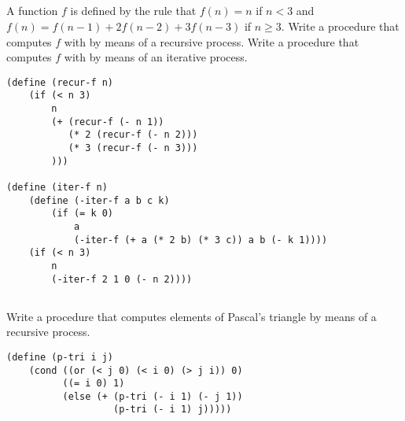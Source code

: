 \documentclass{article}
\begin{document}
\subsection{}
A function $f$ is defined by the rule that $f(n) = n$ if $n < 3$ and $f(n) = f(n - 1) + 2f(n - 2) + 3f(n - 3)$ if $n \geq 3$. Write a procedure that computes $f$ with by means of a recursive process. Write a procedure that computes $f$ with by means of an iterative process.
\begin{lstlisting}
(define (recur-f n)
    (if (< n 3)
        n
        (+ (recur-f (- n 1))
           (* 2 (recur-f (- n 2)))
           (* 3 (recur-f (- n 3)))
        )))

(define (iter-f n)
    (define (-iter-f a b c k)
        (if (= k 0)
            a
            (-iter-f (+ a (* 2 b) (* 3 c)) a b (- k 1))))
    (if (< n 3)
        n
        (-iter-f 2 1 0 (- n 2))))
\end{lstlisting}

\subsection{}
Write a procedure that computes elements of Pascal's triangle by means of a recursive process.
\begin{lstlisting}
(define (p-tri i j)
    (cond ((or (< j 0) (< i 0) (> j i)) 0)
          ((= i 0) 1)
          (else (+ (p-tri (- i 1) (- j 1))
                   (p-tri (- i 1) j)))))
\end{lstlisting}

\end{document}
